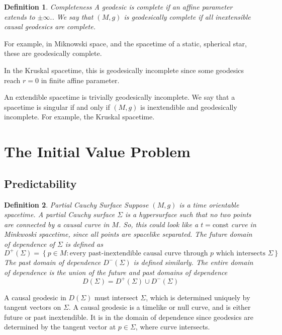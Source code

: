 \documentclass[11pt, oneside]{article}   	%
\theoremstyle{slanted}
\newtheorem*{defn}{Definition}
\begin{document}
\begin{defn}{Completeness}
A geodesic is complete 
if an affine parameter 
extends to $ \pm \infty.$.
We say that $ (M , g ) $
is geodesically complete if all inextensible causal 
geodesics are complete. 
\end{defn}
For example, 
in Miknowski space, and the spacetime of a
static, spherical star, these are geodesically complete. 

In the Kruskal spacetime, 
this is geodesically 
incomplete since 
some geodesics reach $ r =  0 $ in finite affine 
parameter. 

An extendible spacetime is trivially geodesically incomplete. 
We say that 
a spacetime is singular if and only if 
$ \left( M , g  \right)  $ is inextendible and geodesically incomplete. 
For example, the Kruskal spacetime. 


\pagebreak
\section{The Initial Value Problem}


\subsection{Predictability}
\begin{defn}{Partial Cauchy Surface}
Suppose $ \left( M , g  \right)  $ is a 
time orientable spacetime. A partial Cauchy surface 
$ \Sigma $ is a hypersurface such that no 
two points are connected by a causal curve in $ M $. 
So, this could look like a $ t  = \text{const} $
curve in Minkwoski spacetime, since 
all points are spacelike separated. 
The future domain of dependence of $ \Sigma $
is defined as 
\[
  D^ + \left( \Sigma  \right)   = 
  \left\{  p \in M : \text{every past-inextendible causal curve through }  p 
  \text{ which intersects } \Sigma  \right\} 
\] The past domain of 
dependence $ D ^  - \left( \Sigma  \right)  $ is defined 
similarly. The entire domain of 
dependence is the union of the 
future and past domains of dependence
\[  D \left( \Sigma  \right)   = 
D^ + \left( \Sigma  \right)  \cup D ^  - \left( \Sigma  \right)  \] 
\end{defn}

A causal geodesic in $ D \left( \Sigma  \right)  $ must intersect $ \Sigma $, 
which is determined uniquely by tangent vectors on $ \Sigma $. 
A causal geodesic is a timelike or null curve, 
and is either future or past inextendible. 
It is 
in the domain of dependence since 
geodesics are determined 
by the tangent vector at $ p \in \Sigma $, 
where curve intersects. 
\end{document}
